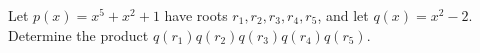 Let $p(x)=x^5+x^2+1$ have roots $r_1,r_2,r_3,r_4,r_5$, and let $q(x)=x^2-2$. Determine the product $q(r_1)q(r_2)q(r_3)q(r_4)q(r_5)$.
